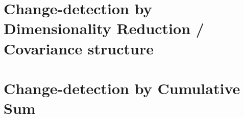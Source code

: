 \section{Change-detection by Dimensionality Reduction / Covariance structure}






\section{Change-detection by Cumulative Sum}

